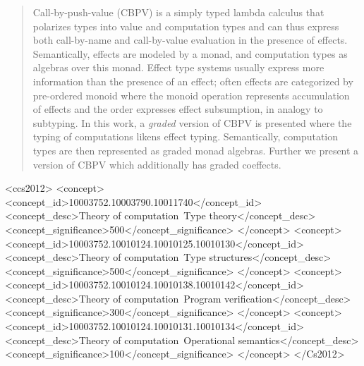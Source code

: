 \documentclass[acmsmall,review,anonymous]{acmart}\settopmatter{printfolios=true,printccs=false,printacmref=false}
\begin{document}
\begin{abstract}
Call-by-push-value (CBPV) is a simply typed lambda calculus that polarizes
types into value and computation types and can thus express both
call-by-name and call-by-value evaluation in the presence of effects.
Semantically, effects are modeled by a monad, and computation types as
algebras over this monad.
Effect type systems usually express more information than the presence
of an effect; often effects are categorized by pre-ordered monoid
where the monoid operation represents accumulation of effects and the
order expresses effect subsumption, in analogy to subtyping.
In this work, a \emph{graded} version of CBPV is presented where the typing
of computations likens effect typing.  Semantically, computation types
are then represented as graded monad algebras.
Further we present a version of CBPV which additionally has graded coeffects.
\end{abstract}


 \begin{CCSXML}
<ccs2012>
<concept>
<concept_id>10003752.10003790.10011740</concept_id>
<concept_desc>Theory of computation~Type theory</concept_desc>
<concept_significance>500</concept_significance>
</concept>
<concept>
<concept_id>10003752.10010124.10010125.10010130</concept_id>
<concept_desc>Theory of computation~Type structures</concept_desc>
<concept_significance>500</concept_significance>
</concept>
<concept>
<concept_id>10003752.10010124.10010138.10010142</concept_id>
<concept_desc>Theory of computation~Program verification</concept_desc>
<concept_significance>300</concept_significance>
</concept>
<concept>
<concept_id>10003752.10010124.10010131.10010134</concept_id>
<concept_desc>Theory of computation~Operational semantics</concept_desc>
<concept_significance>100</concept_significance>
</concept>
</Cs2012>
\end{CCSXML}

\end{document}
